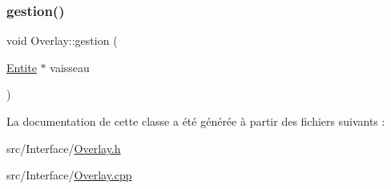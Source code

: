 \subsubsection{\texorpdfstring{gestion()}{gestion()}}
{\footnotesize\ttfamily void Overlay\+::gestion (\begin{DoxyParamCaption}\item[{\hyperlink{class_entite}{Entite} $\ast$}]{vaisseau }\end{DoxyParamCaption})}



La documentation de cette classe a été générée à partir des fichiers suivants \+:\begin{DoxyCompactItemize}
\item 
src/\+Interface/\hyperlink{_overlay_8h}{Overlay.\+h}\item 
src/\+Interface/\hyperlink{_overlay_8cpp}{Overlay.\+cpp}\end{DoxyCompactItemize}
